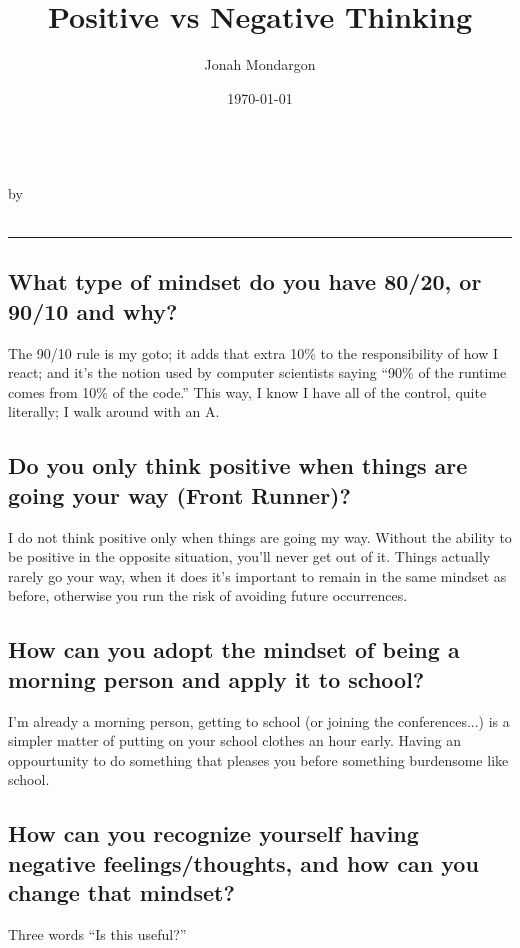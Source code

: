 \documentclass{article}
\title{Positive vs Negative Thinking}
\author{Jonah Mondargon}
\date{\today}
\renewcommand{\maketitle}
{
    \begin{center}
        {\huge\bfseries\thetitle}\\
        \vspace{1ex}
        by \theauthor\\
        \thedate\\
    \end{center}
    \hrule
}
\begin{document}
\pagestyle{empty}
\maketitle

\doublespacing

\subsection*{What type of mindset do you have 80/20, or 90/10 and why?}
    \begin{adjustwidth}{24pt}{0in}
        The 90/10 rule is my goto; it adds that extra 10\% to the responsibility of how I react; and it's the notion used by
        computer scientists saying ``90\% of the runtime comes from 10\% of the code.'' This way, I know I have all of the
        control, quite literally; I walk around with an A.
    \end{adjustwidth}
\subsection*{Do you only think positive when things are going your way (Front Runner)?}
    \begin{adjustwidth}{24pt}{0in}
        I do not think positive only when things are going my way. Without the ability to be positive in the opposite situation,
        you'll never get out of it. Things actually rarely go your way, when it does it's important to remain in the same mindset
        as before, otherwise you run the risk of avoiding future occurrences.
    \end{adjustwidth}
\subsection*{How can you adopt the mindset of being a morning person and apply it to school?}
    \begin{adjustwidth}{24pt}{0in}
        I'm already a morning person, getting to school (or joining the conferences...) is a simpler matter of putting on your 
        school clothes an hour early. Having an oppourtunity to do something that pleases you before something burdensome like
        school.
    \end{adjustwidth}
\subsection*{How can you recognize yourself having negative feelings/thoughts, and how can you change that mindset?}
    \begin{adjustwidth}{24pt}{0in}
        Three words ``Is this useful?''
    \end{adjustwidth}
\end{document}
